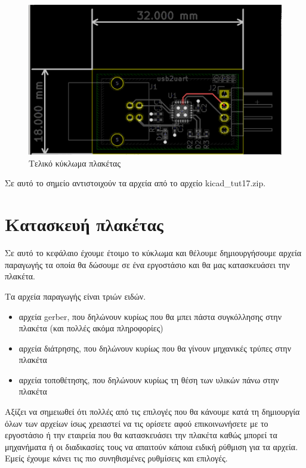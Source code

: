 \documentclass[a4paper]{article}
\begin{document}
\begin{figure}
  \begin{center}
    \includegraphics{img/final-pcb.png}
    \caption{Τελικό κύκλωμα πλακέτας}
    \label{fig:final-pcb}
  \end{center}
\end{figure}

Σε αυτό το σημείο αντιστοιχούν τα αρχεία από το αρχείο kicad\_tut17.zip.

\section{Κατασκευή πλακέτας}
Σε αυτό το κεφάλαιο έχουμε έτοιμο το κύκλωμα και θέλουμε δημιουργήσουμε αρχεία παραγωγής τα οποία θα δώσουμε σε ένα εργοστάσιο και θα μας κατασκευάσει την πλακέτα. 

Τα αρχεία παραγωγής είναι τριών ειδών.

\begin{itemize}
    \item αρχεία gerber, που δηλώνουν κυρίως που θα μπει πάστα συγκόλλησης στην πλακέτα (και πολλές ακόμα πληροφορίες)
    \item αρχεία διάτρησης, που δηλώνουν κυρίως που θα γίνουν μηχανικές τρύπες στην πλακέτα
    \item αρχεία τοποθέτησης, που δηλώνουν κυρίως τη θέση των υλικών πάνω στην πλακέτα
\end{itemize}

Αξίζει να σημειωθεί ότι πολλές από τις επιλογές που θα κάνουμε κατά τη δημιουργία όλων των αρχείων ίσως χρειαστεί να τις ορίσετε αφού επικοινωνήσετε με το εργοστάσιο ή την εταιρεία που θα κατασκευάσει την πλακέτα καθώς μπορεί τα μηχανήματα ή οι διαδικασίες τους να απαιτούν κάποια ειδική ρύθμιση για τα αρχεία. Εμείς έχουμε κάνει τις πιο συνηθισμένες ρυθμίσεις και επιλογές.
\end{document}
